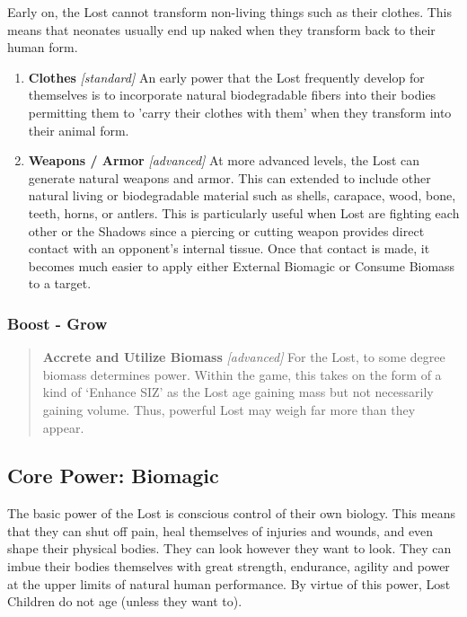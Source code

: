 \documentclass[letterpaper,serif]{rpg-module}
\begin{document}
Early on, the Lost cannot transform non-living things such as their clothes. This means that neonates usually end up naked when they transform back to their human form. 

\begin{enumerate}
    \item \textbf{Clothes} \textit{[standard]} An early power that the Lost frequently develop for themselves is to incorporate natural biodegradable fibers into their bodies permitting them to 'carry their clothes with them' when they transform into their animal form.  
    \item \textbf{Weapons / Armor} \textit{[advanced]} At more advanced levels, the Lost can generate natural weapons and armor. This can extended to include other natural living or biodegradable material such as shells, carapace, wood, bone, teeth, horns, or antlers. This is particularly useful when Lost are fighting each other or the Shadows since a piercing or cutting weapon provides direct contact with an opponent's internal tissue. Once that contact is made, it becomes much easier to apply either External Biomagic or Consume Biomass to a target.
\end{enumerate}

\subsubsection{Boost - Grow}
\begin{quote}
   \textbf{Accrete and Utilize Biomass} \textit{[advanced]}
For the Lost, to some degree biomass determines power. Within the game, this takes on the form of a kind of `Enhance SIZ' as the Lost age gaining mass but not necessarily gaining volume. Thus, powerful Lost may weigh far more than they appear.
\end{quote}

\subsection{Core Power: Biomagic }

The basic power of the Lost is conscious control of their own biology. This means that they can shut off pain, heal themselves of injuries and wounds, and even shape their physical bodies. They can look however they want to look. They can imbue their bodies themselves with great strength, endurance, agility and power at the upper limits of natural human performance. By virtue of this power, Lost Children do not age (unless they want to). 
\end{document}
